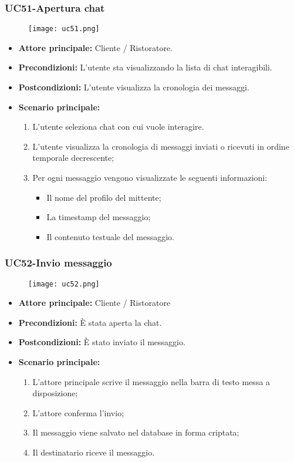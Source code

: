 \subsubsection{UC51-Apertura chat}
\begin{figure}[h] \texttt{[image: uc51.png]} \end{figure}
\begin{itemize}
\item \textbf{Attore principale:} Cliente / Ristoratore.
\item \textbf{Precondizioni:} L'utente sta visualizzando la lista di chat interagibili.
\item \textbf{Postcondizioni:} L'utente visualizza la cronologia dei messaggi.
\item \textbf{Scenario principale:}
\begin{enumerate}
    \item L'utente seleziona chat con cui vuole interagire.
    \item L'utente visualizza la cronologia di messaggi inviati o ricevuti in ordine temporale decrescente;
    \item Per ogni messaggio vengono visualizzate le seguenti informazioni:
      \begin{itemize}
        \item Il nome del profilo del mittente;
        \item La timestamp del messaggio;
        \item Il contenuto testuale del messaggio.
      \end{itemize}
\end{enumerate}
\end{itemize}

\subsubsection{UC52-Invio messaggio}
\begin{figure}[h] \texttt{[image: uc52.png]} \end{figure}
\begin{itemize}
\item \textbf{Attore principale:} Cliente / Ristoratore
\item \textbf{Precondizioni:} È stata aperta la chat.
\item \textbf{Postcondizioni:} È stato inviato il messaggio.
\item \textbf{Scenario principale:}
\begin{enumerate}
    \item L'attore principale scrive il messaggio nella barra di testo messa a disposizione;
    \item L'attore conferma l'invio;
    \item Il messaggio viene salvato nel database in forma criptata;
    \item Il destinatario riceve il messaggio.
\end{enumerate}
\end{itemize}
